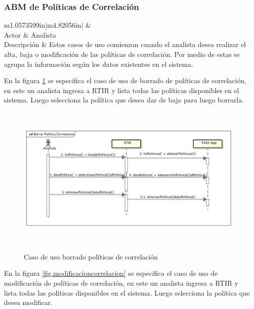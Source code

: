 \subsubsection{ABM de Políticas de Correlación}
\begin{flushleft}
	\tablefirsthead{}
	\tablehead{}
	\tabletail{}
	\tablelasttail{}
	\begin{supertabular}{m{1.0573599in}|m{4.82056in}|}
		 &
		\\\hline
		{Actor} &
		{Analista}\\
		{Descripción} &
		{Estos casos de uso comienzan cuando el analista desea realizar el alta, baja o
			modificación de las políticas de correlación. Por medio de estas se agrupa la información según los datos existentes en
			el sistema.}\\\hhline{~-}
	\end{supertabular}
\end{flushleft}

\bigskip
	En la figura \ref{fig.borradocorrelacion} se especifica el caso de uso de borrado de políticas de correlación, en este un analista ingresa a RTIR y
	lista todas las políticas disponibles en el sistema. Luego selecciona la política que desea dar de baja para luego
	borrarla.
	
\bigskip
\begin{figure}[H]
	\includegraphics[width=5.7634in,height=2.898in]{Analisis22-img/Analisis22-img020.png}
	\caption{Caso de uso borrado políticas de correlación} 
	\label{fig.borradocorrelacion}
\end{figure}

\bigskip

	En la figura \ref{fig.modificacioncorrelacion} se especifica el caso de uso de modificación de políticas de correlación, en este un analista ingresa a
	RTIR y lista todas las políticas disponibles en el sistema. Luego selecciona la política que desea modificar.

